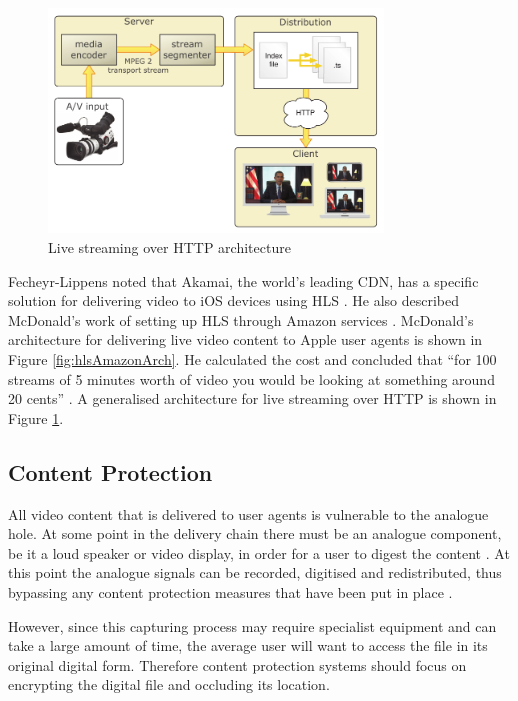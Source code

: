 \documentclass[journal]{IEEEtran}
\begin{document}
\begin{figure}[!t]
\centering
\includegraphics[width=3.5in]{streaming-architecture}
\caption{Live streaming over HTTP architecture \cite{techreport:aReviewOfHTTPLiveStreaming}}
\label{fig:HTTPLiveStreamingArch}
\end{figure}

Fecheyr-Lippens noted that Akamai, the world's leading CDN, has a specific solution for delivering video to iOS devices using HLS \cite{whitePaper:akamaiHDNetwork}\cite{techreport:aReviewOfHTTPLiveStreaming}. He also described McDonald's work of setting up HLS through Amazon services \cite{website:iPhoneHLSAmazon}. McDonald's architecture for delivering live video content to Apple user agents is shown in Figure \ref{fig:hlsAmazonArch}. He calculated the cost and concluded that ``for 100 streams of 5 minutes worth of video you would be looking at something around 20 cents'' \cite{website:iPhoneHLSAmazon}. A generalised architecture for live streaming over HTTP is shown in Figure \ref{fig:HTTPLiveStreamingArch}.

\subsection{Content Protection}
All video content that is delivered to user agents is vulnerable to the analogue hole. At some point in the delivery chain there must be an analogue component, be it a loud speaker or video display, in order for a user to digest the content \cite{inproceedings:closingTheAnalogueHole}. At this point the analogue signals can be recorded, digitised and redistributed, thus bypassing any content protection measures that have been put in place \cite{inproceedings:closingTheAnalogueHole}.

However, since this capturing process may require specialist equipment and can take a large amount of time, the average user will want to access the file in its original digital form. Therefore content protection systems should focus on encrypting the digital file and occluding its location.
\end{document}
